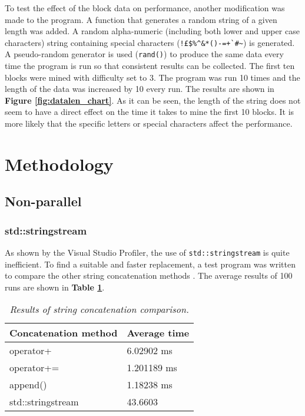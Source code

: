 \documentclass[12pt, a4paper]{article}
\begin{document}
    To test the effect of the block data on performance, another modification was made to the program. A function that generates a random string of a given length \cite{randString} was added. A random alpha-numeric (including both lower and upper case characters) string containing special characters (\verb|!£$%^&*()-=+`#~|) is generated. A pseudo-random generator is used (\texttt{rand()}) to produce the same data every time the program is run so that consistent results can be collected. The first ten blocks were mined with difficulty set to 3. The program was run 10 times and the length of the data was increased by 10 every run. The results are shown in \textbf{Figure \ref{fig:datalen_chart}}. As it can be seen, the length of the string does not seem to have a direct effect on the time it takes to mine the first 10 blocks. It is more likely that the specific letters or special characters affect the performance.

    \section{Methodology}    
    \subsection{Non-parallel} 
    \subsubsection{std::stringstream} As shown by the Visual Studio Profiler, the use of \texttt{std::stringstream} is quite inefficient. To find a suitable and faster replacement, a test program was written to compare the other string concatenation methods \cite{SOconcat} \cite{GHprogram}. The average results of 100 runs are shown in \textbf{Table \ref{table:concatResults}}.

    \begin{table}[!h]
        \centering
        \caption{\small{\textit{Results of string concatenation comparison.}}}
        \label{table:concatResults}
        \begin{tabular}{|l|l|} 
        \hline
        \rowcolor[rgb]{0.502,0.502,0.502} Concatenation method & Average time                               \\ 
        \hline
        \rowcolor[rgb]{0.753,0.753,0.753} operator+            & \textcolor[rgb]{0.2,0.2,0.2}{6.02902 ms}   \\ 
        \hline
        \rowcolor[rgb]{0.753,0.753,0.753} operator+=           & \textcolor[rgb]{0.2,0.2,0.2}{1.201189 ms}  \\ 
        \hline
        \rowcolor[rgb]{0.753,0.753,0.753} append()             & \textcolor[rgb]{0.2,0.2,0.2}{1.18238 ms}   \\ 
        \hline
        \rowcolor[rgb]{0.753,0.753,0.753} std::stringstream    & \textcolor[rgb]{0.2,0.2,0.2}{43.6603}      \\
        \hline
        \end{tabular}
    \end{table}
\end{document}
